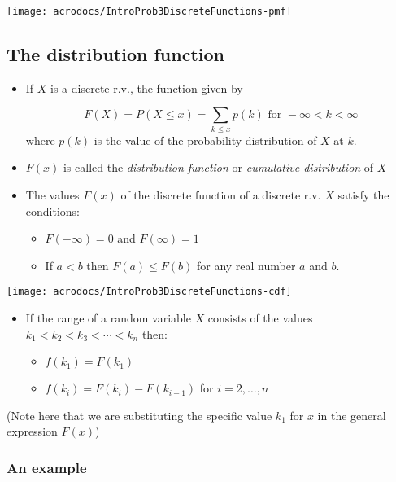 \documentclass[12pt]{extbook}
\begin{document}
\texttt{[image: acrodocs/IntroProb3DiscreteFunctions-pmf]}


\subsection{The distribution function}

\begin{itemize}
\item If $X$ is a discrete r.v., the function given by 

\begin{displaymath}
F(X) = P(X \leq x) = \sum_{k \leq x} p(k)\mbox{ for }-\infty < k < \infty
\end{displaymath}
where $p(k)$ is the value of the probability distribution of $X$ at $k$.
\item $F(x)$ is called the \emph{distribution function} or \emph{cumulative distribution} of $X$
\item The values $F(x)$ of the discrete function of a discrete r.v. $X$ satisfy the conditions:
\begin{itemize}
\item $F(-\infty) = 0$ and $F(\infty) = 1$
\item If $a < b$ then $F(a) \leq F(b)$ for any real number $a$ and $b$.
\end{itemize}
\end{itemize}


 
\texttt{[image: acrodocs/IntroProb3DiscreteFunctions-cdf]}




\begin{itemize}
\item If the range of a random variable $X$ consists of the values $k_{1} < k_{2} < k_{3} < \cdots < k_{n}$ then:
\begin{itemize}
\item $f(k_{1}) = F(k_{1})$
\item $f(k_{i}) = F(k_{i}) - F(k_{i-1})$ for $i=2, \ldots, n$
\end{itemize}
\end{itemize}

(Note here that we are substituting the specific value $k_1$ for $x$ in the general expression $F(x)$)




\subsubsection{An example}
\end{document}
